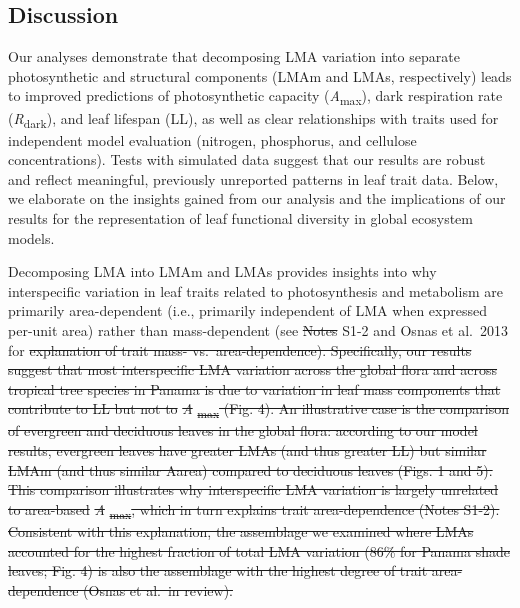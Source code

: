 \documentclass[12pt,]{article}
\theoremstyle{definition}
\theoremstyle{definition}
\theoremstyle{definition}
\theoremstyle{remark}
\providecommand{\DIFaddtex}[1]{{\protect\color{blue}\uwave{#1}}} %
\providecommand{\DIFdeltex}[1]{{\protect\color{red}\sout{#1}}}                      %
\providecommand{\DIFaddbegin}{} %
\providecommand{\DIFaddend}{} %
\providecommand{\DIFdelbegin}{} %
\providecommand{\DIFdelend}{} %
\providecommand{\DIFadd}[1]{\texorpdfstring{\DIFaddtex{#1}}{#1}} %
\providecommand{\DIFdel}[1]{\texorpdfstring{\DIFdeltex{#1}}{}} %
\newcommand{\DIFscaledelfig}{0.5}
\newlength{\DIFdelgraphicswidth} %
\newlength{\DIFdelgraphicsheight} %
\newcommand{\DIFaddincludegraphics}[2][]{{\color{blue}\fbox{\DIFOincludegraphics[#1]{#2}}}} %
\newcommand{\DIFdelincludegraphics}[2][]{%
\sbox{\DIFdelgraphicsbox}{\DIFOincludegraphics[#1]{#2}}%
\settoboxwidth{\DIFdelgraphicswidth}{\DIFdelgraphicsbox} %
\settoboxtotalheight{\DIFdelgraphicsheight}{\DIFdelgraphicsbox} %
\scalebox{\DIFscaledelfig}{%
\parbox[b]{\DIFdelgraphicswidth}{\usebox{\DIFdelgraphicsbox}\\[-\baselineskip] \rule{\DIFdelgraphicswidth}{0em}}\llap{\resizebox{\DIFdelgraphicswidth}{\DIFdelgraphicsheight}{%
\setlength{\unitlength}{\DIFdelgraphicswidth}%
\begin{picture}(1,1)%
\thicklines\linethickness{2pt} %
{\color[rgb]{1,0,0}\put(0,0){\framebox(1,1){}}}%
{\color[rgb]{1,0,0}\put(0,0){\line( 1,1){1}}}%
{\color[rgb]{1,0,0}\put(0,1){\line(1,-1){1}}}%
\end{picture}%
}\hspace*{3pt}}} %
} %
\DeclareRobustCommand{\DIFaddbegin}{\DIFOaddbegin \let\includegraphics\DIFaddincludegraphics} %
\DeclareRobustCommand{\DIFaddend}{\DIFOaddend \let\includegraphics\DIFOincludegraphics} %
\DeclareRobustCommand{\DIFdelbegin}{\DIFOdelbegin \let\includegraphics\DIFdelincludegraphics} %
\DeclareRobustCommand{\DIFdelend}{\DIFOaddend \let\includegraphics\DIFOincludegraphics} %
\begin{document}
\begin{itemize}
\hypertarget{discussion}{%
\section{Discussion}\label{discussion}}

Our analyses demonstrate that decomposing LMA variation into separate
photosynthetic and structural components (LMAm and LMAs, respectively)
leads to improved predictions of photosynthetic capacity
(\emph{A}\textsubscript{max}), dark respiration rate
(\emph{R}\textsubscript{dark}), and leaf lifespan (LL), as well as clear
relationships with traits used for independent model evaluation
(nitrogen, phosphorus, and cellulose concentrations). Tests with
simulated data suggest that our results are robust and reflect
meaningful, previously unreported patterns in leaf trait data. Below, we
elaborate on the insights gained from our analysis and the implications
of our results for the representation of leaf functional diversity in
global ecosystem models.

Decomposing LMA into LMAm and LMAs provides insights into why
interspecific variation in leaf traits related to photosynthesis and
metabolism are primarily area-dependent (i.e., primarily independent of
LMA when expressed per-unit area) rather than mass-dependent (see
\DIFdelbegin \DIFdel{Notes
}\DIFdelend \DIFaddbegin \DIFadd{Supplement }\DIFaddend S1-2 and Osnas et al.~2013 for \DIFdelbegin \DIFdel{explanation of trait mass-
vs.~area-dependence). Specifically, our results suggest that most
interspecific LMA variation across the global flora and across tropical
tree species in Panama is due to variation in leaf mass components that
contribute to LL but not to }\emph{\DIFdel{A}}%
\DIFdel{\textsubscript{max} (Fig. 4). An
illustrative case is the comparison of evergreen and deciduous leaves in
the global flora: according to our model results, evergreen leaves have
greater LMAs (and thus greater LL) but similar LMAm (and thus similar
Aarea) compared to deciduous leaves (Figs. 1 and 5). This comparison
illustrates why interspecific LMA variation is largely unrelated to
area-based }\emph{\DIFdel{A}}%
\DIFdel{\textsubscript{max}, which in turn explains trait
area-dependence (Notes S1-2). Consistent with this explanation, the
assemblage we examined where LMAs accounted for the highest fraction of
total LMA variation (86\% for Panama shade leaves; Fig. 4) is also the
assemblage with the highest degree of trait area-dependence (Osnas et
al.~in review).
}%


\end{itemize}
\end{document}
